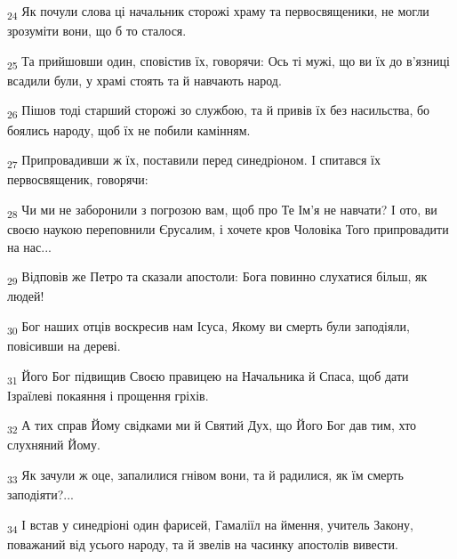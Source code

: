 \begin{tcolorbox}
\textsubscript{24} Як почули слова ці начальник сторожі храму та первосвященики, не могли зрозуміти вони, що б то сталося.
\end{tcolorbox}
\begin{tcolorbox}
\textsubscript{25} Та прийшовши один, сповістив їх, говорячи: Ось ті мужі, що ви їх до в'язниці всадили були, у храмі стоять та й навчають народ.
\end{tcolorbox}
\begin{tcolorbox}
\textsubscript{26} Пішов тоді старший сторожі зо службою, та й привів їх без насильства, бо боялись народу, щоб їх не побили камінням.
\end{tcolorbox}
\begin{tcolorbox}
\textsubscript{27} Припровадивши ж їх, поставили перед синедріоном. І спитався їх первосвященик, говорячи:
\end{tcolorbox}
\begin{tcolorbox}
\textsubscript{28} Чи ми не заборонили з погрозою вам, щоб про Те Ім'я не навчати? І ото, ви своєю наукою переповнили Єрусалим, і хочете кров Чоловіка Того припровадити на нас...
\end{tcolorbox}
\begin{tcolorbox}
\textsubscript{29} Відповів же Петро та сказали апостоли: Бога повинно слухатися більш, як людей!
\end{tcolorbox}
\begin{tcolorbox}
\textsubscript{30} Бог наших отців воскресив нам Ісуса, Якому ви смерть були заподіяли, повісивши на дереві.
\end{tcolorbox}
\begin{tcolorbox}
\textsubscript{31} Його Бог підвищив Своєю правицею на Начальника й Спаса, щоб дати Ізраїлеві покаяння і прощення гріхів.
\end{tcolorbox}
\begin{tcolorbox}
\textsubscript{32} А тих справ Йому свідками ми й Святий Дух, що Його Бог дав тим, хто слухняний Йому.
\end{tcolorbox}
\begin{tcolorbox}
\textsubscript{33} Як зачули ж оце, запалилися гнівом вони, та й радилися, як їм смерть заподіяти?...
\end{tcolorbox}
\begin{tcolorbox}
\textsubscript{34} І встав у синедріоні один фарисей, Гамаліїл на ймення, учитель Закону, поважаний від усього народу, та й звелів на часинку апостолів вивести.
\end{tcolorbox}
